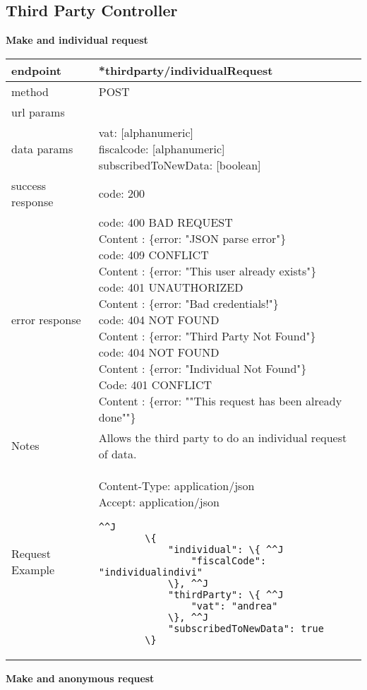 \subsection{Third Party Controller}

\textbf{Make and individual request} \\

\begin{tabularx}{\linewidth}{| l| l }
	\hline
	endpoint & *thirdparty/individualRequest \\
	\hline
	method & POST \\
	\hline
	url params & \\
	\hline
	data params &
	\parbox{0.7\textwidth}{
		\bigskip
		vat: [alphanumeric]\\
		fiscalcode: [alphanumeric]\\
		subscribedToNewData: [boolean]
		\bigskip
	} \\
	\hline
	success response &
	\parbox{0.7\textwidth}{
		\bigskip
		code: 200
		\bigskip
	} \\
	\hline
	error response &
	\parbox{0.7\textwidth}{
		\bigskip
		code: 400 BAD REQUEST \\
		Content : \{error: "JSON parse error"\}\\
		code: 409 CONFLICT \\
		Content : \{error: "This user already exists"\}\\
		code: 401 UNAUTHORIZED \\
		Content : \{error: "Bad credentials!"\}\\
		code: 404 NOT FOUND \\
		Content : \{error: "Third Party Not Found"\}\\
		code: 404 NOT FOUND \\
		Content : \{error: "Individual Not Found"\}\\
		Code: 401 CONFLICT \\
		Content : \{error: ""This request has been already done""\}\\
		\bigskip
	} \\
	\hline
	Notes & 
	\parbox{0.7\textwidth}{
		\bigskip Allows the third party to do an individual request of data.
	\bigskip}  \\
	\hline
		Request Example & 
		\parbox{0.8\textwidth}{
		\bigskip
		Content-Type: application/json \\
		Accept: application/json \\
		\bigskip
		\begin{lstlisting}^^J
		\{
			"individual": \{ ^^J
				"fiscalCode": "individualindivi"
			\}, ^^J
			"thirdParty": \{ ^^J
				"vat": "andrea"
			\}, ^^J
			"subscribedToNewData": true
		\}
	\end{lstlisting}
	} \\
	\hline
\end{tabularx}
\newpage
\textbf{Make and anonymous request} \\

